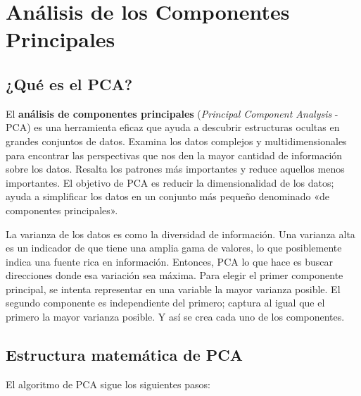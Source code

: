 \chapter{Análisis de los Componentes Principales}

\section{¿Qué es el PCA?}
El \textbf{análisis de componentes principales} (\textit{Principal Component Analysis} - PCA) es una herramienta eficaz que ayuda a descubrir estructuras ocultas en grandes conjuntos de datos. Examina los datos complejos y multidimensionales para encontrar las perspectivas que nos den la mayor cantidad de información sobre los datos. Resalta los patrones más importantes y reduce aquellos menos importantes. El objetivo de PCA es reducir la dimensionalidad de los datos; ayuda a simplificar los datos en un conjunto más pequeño denominado «de componentes principales».


La varianza de los datos es como la diversidad de información. Una varianza alta es un indicador de que tiene una amplia gama de valores, lo que posiblemente indica una fuente rica en información. Entonces, PCA lo que hace es buscar direcciones donde esa variación sea máxima. Para elegir el primer componente principal, se intenta representar en una variable la mayor varianza posible. El segundo componente es independiente del primero; captura al igual que el primero la mayor varianza posible. Y así se crea cada uno de los componentes.

\section{Estructura matemática de PCA}
El algoritmo de PCA sigue los siguientes pasos:

